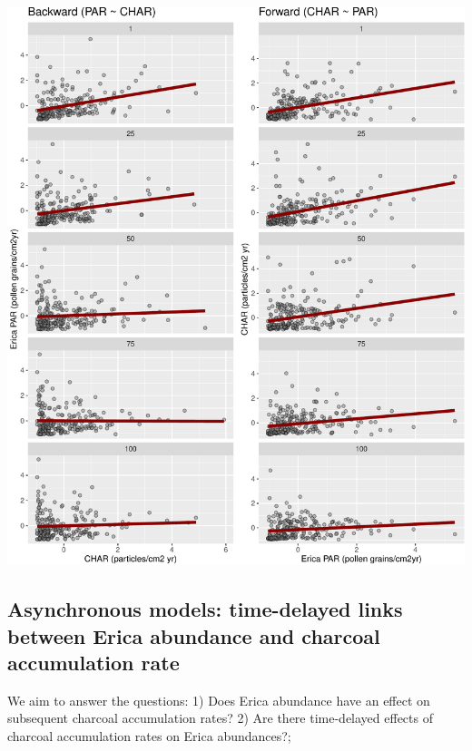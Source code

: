 \documentclass[
]{article}
\let\origfigure\figure
\let\endorigfigure\endfigure
\renewenvironment{figure}[1][2] {
    \expandafter\origfigure\expandafter[H]
} {
    \endorigfigure
}
\begin{document}
\begin{figure}
\centering
\includegraphics{Workflow_files/figure-latex/unnamed-chunk-11-1.pdf}
\caption{Lags 1, 25, 50, 75, and 100 of the backward and forward
datasets. Lag number can be found withing the grey strips. They have to
be multiplied by 10 to convert lags into years. Lines represent linear
models equivalent to those fitted in the following section.}
\end{figure}

\hypertarget{asynchronous-models-time-delayed-links-between-erica-abundance-and-charcoal-accumulation-rate}{%
\subsection{Asynchronous models: time-delayed links between Erica
abundance and charcoal accumulation
rate}\label{asynchronous-models-time-delayed-links-between-erica-abundance-and-charcoal-accumulation-rate}}

We aim to answer the questions: 1) Does Erica abundance have an effect
on subsequent charcoal accumulation rates? 2) Are there time-delayed
effects of charcoal accumulation rates on Erica abundances?;
\end{document}
